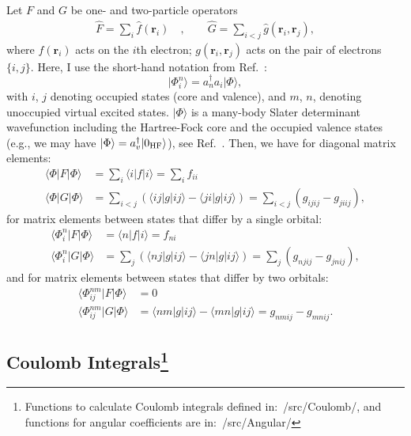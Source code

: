 \documentclass[10pt,twocolumn,a4paper]{article}%
\newcommand{\bra}[1]{\ensuremath{\langle #1|}}	%
\newcommand{\ket}[1]{\ensuremath{|#1\rangle}}	%
\renewcommand{\v}[1]{\ensuremath{\boldsymbol{#1}}}		%
\begin{document}
Let $F$ and $G$ be one- and two-particle operators
\begin{align}
\hat F = \sum_i \hat f(\v{r}_i) \quad,\qquad
\hat G = \sum_{i<j} \hat g(\v{r}_i,\v{r}_j),
\end{align}
where $f(\v{r}_i)$ acts on the $i$th electron; $g(\v{r}_i,\v{r}_j)$ acts on the pair of electrons $\{i,j\}$.
Here, I use the short-hand notation from Ref.~\cite{Lindgren1986}:
\[
\ket{\Phi_i^n} = a_n^\dag a_i \ket{\Phi},
\]
with $i$, $j$ denoting occupied states (core and valence), and $m$, $n$, denoting unoccupied virtual excited states.
$\ket{\Phi}$ is a many-body Slater determinant wavefunction including the Hartree-Fock core and the occupied valence states (e.g., we may have $\ket{\Phi} = a_v^\dag\ket{0_{\rm HF}}$), see Ref.~\cite{Lindgren1986}.
Then, we have for diagonal matrix elements:
\begin{equation}\begin{split}
\bra{\Phi}F\ket{\Phi} &= \sum_i \bra{i}f\ket{i}  = \sum_i f_{ii}\\
\bra{\Phi}G\ket{\Phi} &= \sum_{i<j} \left( \bra{ij}g\ket{ij} - \bra{ji}g\ket{ij} \right) = \sum_{i<j} (g_{ijij}-g_{jiij}),
\end{split}\end{equation}
for matrix elements between states that differ by a single orbital:
\begin{equation}\begin{split}
\bra{\Phi^n_i}F\ket{\Phi} &=  \bra{n}f\ket{i}  = f_{ni}\\
\bra{\Phi^n_i}G\ket{\Phi} &= \sum_{j} \left( \bra{nj}g\ket{ij} - \bra{jn}g\ket{ij} \right)  = \sum_{j} (g_{njij}-g_{jnij}) ,
\end{split}\end{equation}
and for matrix elements between states that differ by two orbitals:
\begin{equation}\begin{split}\label{eq:G-twobody}
\bra{\Phi^{nm}_{ij}}F\ket{\Phi} &=  0 \\
\bra{\Phi^{nm}_{ij}}G\ket{\Phi} &= \bra{nm}g\ket{ij} - \bra{mn}g\ket{ij} = g_{nmij}-g_{mnij}.
\end{split}\end{equation}




\subsection[Coulomb Integrals]{Coulomb Integrals\label{sec:app-Coulomb}\footnote{Functions to calculate Coulomb integrals defined in:~/src/Coulomb/, and functions for angular coefficients are in:~/src/Angular/}}
\end{document}
